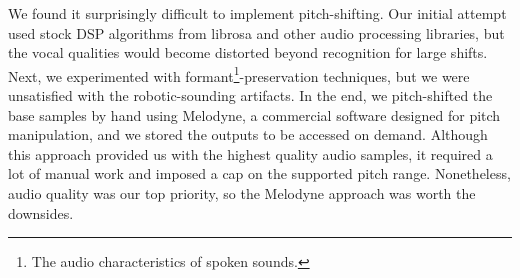 We found it surprisingly difficult to implement pitch-shifting. Our initial attempt used stock DSP algorithms from librosa and other audio processing libraries, but the vocal qualities would become distorted beyond recognition for large shifts. Next, we experimented with formant\footnote{The audio characteristics of spoken sounds.}-preservation techniques, but we were unsatisfied with the robotic-sounding artifacts. In the end, we pitch-shifted the base samples by hand using Melodyne, a commercial software designed for pitch manipulation, and we stored the outputs to be accessed on demand. Although this approach provided us with the highest quality audio samples, it required a lot of manual work and imposed a cap on the supported pitch range. Nonetheless, audio quality was our top priority, so the Melodyne approach was worth the downsides.